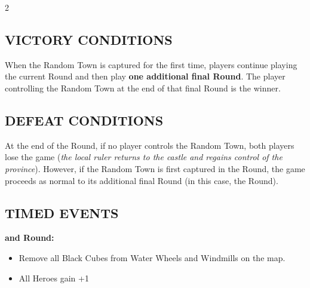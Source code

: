 \begin{multicols*}{2}
\subsection*{\MakeUppercase{Victory Conditions}}
When the Random Town is captured for the first time, players continue playing the current Round and then play \textbf{one additional final Round}.
The player controlling the Random Town at the end of that final Round is the winner.

\subsection*{\MakeUppercase{Defeat Conditions}}
At the end of the  Round, if no player controls the Random Town, both players lose the game (\textit{the local ruler returns to the castle and regains control of the province}).
However, if the Random Town is first captured in the  Round, the game proceeds as normal to its additional final Round (in this case, the  Round).

\subsection*{\MakeUppercase{Timed Events}}

  \textbf{ and  Round:}
\begin{itemize}
  \item Remove all Black Cubes from Water Wheels and Windmills on the map.
  \item All Heroes gain +1~
\end{itemize}

\end{multicols*}

